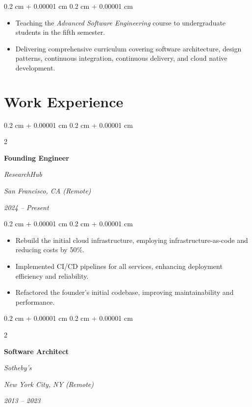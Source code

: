 \documentclass[10pt, a4paper]{article}
\newenvironment{highlights}{
    \begin{itemize}[
        topsep=0.10 cm,
        parsep=0.10 cm,
        partopsep=0pt,
        itemsep=0pt,
        leftmargin=0.4 cm + 10pt
    ]
}{
    \end{itemize}
} %
\newenvironment{onecolentry}{
    \begin{adjustwidth}{
        0.2 cm + 0.00001 cm
    }{
        0.2 cm + 0.00001 cm
    }
}{
    \end{adjustwidth}
} %
\newenvironment{twocolentry}[2][]{
    \onecolentry
    \def\secondColumn{#2}
    \setcolumnwidth{\fill, 8 cm}
    \begin{paracol}{2}
}{
    \switchcolumn \raggedleft \secondColumn
    \end{paracol}
    \endonecolentry
} %
\begin{document}
\vspace{0.10 cm}
\begin{onecolentry}
    \begin{highlights}
        \item Teaching the \textit{Advanced Software Engineering} course to undergraduate students in the fifth semester.
        \item Delivering comprehensive curriculum covering software architecture, design patterns, continuous integration, continuous delivery, and cloud native development.
    \end{highlights}
\end{onecolentry}




\section{Work Experience}



%
%
\begin{twocolentry}{
        \textit{San Francisco, CA (Remote)}

        \textit{2024 – Present}}
    \textbf{Founding Engineer}

    \textit{ResearchHub}
\end{twocolentry}

\vspace{0.10 cm}
\begin{onecolentry}
    \begin{highlights}
        \item Rebuild the initial cloud infrastructure, employing infrastructure-as-code and reducing costs by 50\%.
        \item Implemented CI/CD pipelines for all services, enhancing deployment efficiency and reliability.
        \item Refactored the founder's initial codebase, improving maintainability and performance.
    \end{highlights}
\end{onecolentry}


\vspace{0.2 cm}

%
%
\begin{twocolentry}{
        \textit{New York City, NY (Remote)}

        \textit{2013 – 2023}}
    \textbf{Software Architect}

    \textit{Sotheby's}
\end{twocolentry}
\end{document}

